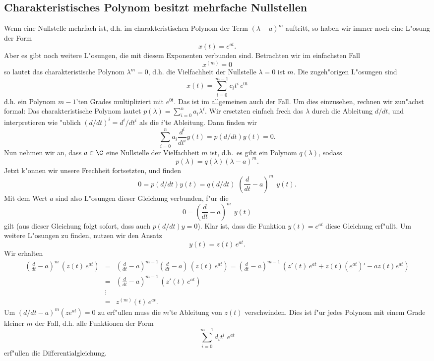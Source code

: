 \subsection{Charakteristisches Polynom besitzt mehrfache Nullstellen}
Wenn eine Nullstelle mehrfach ist, d.h. im charakteristischen Polynom der Term 
$(\lambda-a)^m$ auftritt, so haben wir immer noch eine L"osung der Form 
$$x(t) = e^{at}.$$
Aber es gibt noch weitere L"osungen, die mit diesem Exponenten verbunden sind. 
Betrachten wir im einfachsten Fall
$$ x^{(m)} = 0$$
so lautet das charakteristische Polynom $\lambda^m=0$, d.h. die Vielfachheit der 
Nullstelle $\lambda=0$ ist $m$. Die zugeh"origen L"osungen sind 
$$ x(t) = \sum_{i=0}^{m-1} c_i t^i \, e^{0t}$$
d.h. ein Polynom $m-1$'ten Grades multipliziert mit $e^{0t}$. Das ist im 
allgemeinen auch der Fall. Um dies einzusehen, rechnen wir zun"achst 
formal: Das 
charakteristische Polynom lautet
$p(\lambda) = \sum_{i=0}^n a_i\lambda^i$. Wir ersetzten einfach frech das $\lambda$ 
durch die Ableitung $d/dt$, und interpretieren  wie "ublich $(d/dt)^i = d^i/dt^i$ 
als die $i$'te Ableitung. Dann finden wir
$$\sum_{i=0}^n a_i \frac {d^i}{dt^i}y(t) = p(d/dt) y(t) = 0.$$
Nun nehmen wir an, dass $a\in\C$ eine Nullstelle der Vielfachheit $m$ ist, d.h.\ es gibt ein Polynom $q(\lambda)$,
sodass
$$ p(\lambda) = q(\lambda) (\lambda-a)^m.$$
Jetzt k"onnen wir unsere Frechheit fortsetzten, und finden
$$ 0 = p(d/dt) y(t) = q(d/dt)\,\,\left(\frac d {dt} - a\right)^m \,\ y(t).$$
Mit dem Wert $a$ sind also L"osungen dieser Gleichung verbunden, f"ur die 
$$ 0 = \left(\frac d {dt} - a\right)^m \,\ y(t)$$
gilt (aus dieser Gleichung folgt sofort, dass auch $p(d/dt) y=0$).
Klar ist, dass die Funktion $y(t) = e^{at}$ diese Gleichung erf"ullt. 
Um weitere 
L"osungen zu finden, nutzen wir den Ansatz
$$ y(t) = z(t) \, e^{a t}.$$
Wir erhalten
\begin{eqnarray*}
\left(\frac d {dt} - a\right)^m \,\left(z(t) \, e^{a t}\right) 
& = & 
\left(\frac d {dt} - a\right)^{m-1}  \left(\frac d {dt} - a\right)\,\left(z(t) \, e^{a t}\right) 
= 
\left(\frac d {dt} - a\right)^{m-1}  \,\left(z'(t) \, e^{a t}+ z(t) (e^{a t})' - a z(t) e^{at}\right) \\
& = &
\left(\frac d {dt} - a\right)^{m-1}  \,\left(z'(t) \, e^{a t}\right) \\
&\vdots &\\
& = &
 z^{(m)}(t) \, e^{a t}.
\end{eqnarray*}
Um $(d/dt -a)^m (z e^{at})=0$ zu erf"ullen muss die $m$'te Ableitung von $z(t)$ 
verschwinden. Dies ist f"ur jedes Polynom mit einem Grade kleiner $m$ der Fall, 
d.h. alle Funktionen der Form $$ \sum_{i=0}^{m-1} d_i t^i\,\, e^{at}$$
erf"ullen die Differentialgleichung.

